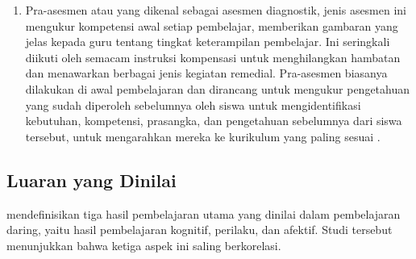 \begin{enumerate}
    \item Pra-asesmen atau yang dikenal sebagai asesmen diagnostik, jenis asesmen ini
    mengukur kompetensi awal setiap pembelajar, memberikan gambaran yang jelas kepada
    guru tentang tingkat keterampilan pembelajar. Ini seringkali diikuti oleh semacam
    instruksi kompensasi untuk menghilangkan hambatan dan menawarkan berbagai jenis
    kegiatan remedial. Pra-asesmen biasanya dilakukan di awal pembelajaran dan dirancang
    untuk mengukur pengetahuan yang sudah diperoleh sebelumnya oleh siswa untuk
    mengidentifikasi kebutuhan, kompetensi, prasangka, dan pengetahuan sebelumnya
    dari siswa tersebut, untuk mengarahkan mereka ke kurikulum yang paling sesuai
    \autocite{Ihichr2024}.
\end{enumerate}

\subsection{Luaran yang Dinilai}
\textcite{Ihichr2024} mendefinisikan tiga hasil pembelajaran utama yang dinilai
dalam pembelajaran daring, yaitu hasil pembelajaran kognitif, perilaku, dan afektif.
Studi tersebut menunjukkan bahwa ketiga aspek ini saling berkorelasi.

